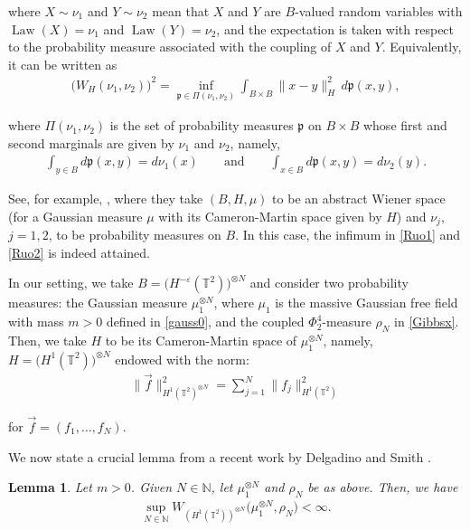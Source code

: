 \documentclass[letterpaper, 11pt,  reqno]{amsart}
\newtheorem{lemma}[theorem]{Lemma}
\DeclareMathOperator{\Law}{Law}
\newcommand{\1}{\hspace{0.5mm}\text{I}\hspace{0.2mm}}
\newcommand{\noi}{\noindent}
\newcommand{\T}{\mathbb{T}}
\newcommand{\N}{\mathbb{N}}
\newcommand{\eps}{\varepsilon}
\newcommand{\plan}{\mathfrak{p}}
\newcommand{\muN}{\mu_1^{\otimes N}}
\numberwithin{equation}{section}
\numberwithin{theorem}{section}
\begin{document}
\noi
where $X \sim \nu_1$ and $Y \sim \nu_2$ mean that $X$ and $Y$ are $B$-valued random variables 
with $\Law(X) = \nu_1$ and $\Law(Y) = \nu_2$, 
and the expectation is taken with respect 
to the probability measure associated with the coupling of $X$ and $Y$.
Equivalently, it can be written as
\begin{align}
\Big(W_H (\nu_1, \nu_2)\Big)^2
= \inf_{\plan\in\Pi(\nu_1, \nu_2)} 
\int_{B \times B}  \|x-y\|_H^2 \,  d\plan (x, y), 
\label{Ruo2}
\end{align}

\noi
where  $\Pi(\nu_1, \nu_2)$ is the set of probability measures $\plan$
on $B \times B$
whose first and second marginals are given by $\nu_1$ and $\nu_2$, 
namely, 
\begin{align}
 \int_{y \in B}  d\plan (x, y) = d\nu_1(x) \qquad \text{and}
\qquad 
 \int_{x \in B}  d\plan (x, y) = d\nu_2(y).
\label{Ruo2a}
\end{align}


\noi
See, for example, 
\cite{FU, FSS}, 
where 
they take $(B, H, \mu)$ to be an abstract Wiener space (for a Gaussian measure
$\mu$ with its Cameron-Martin space given by $H$)
and $\nu_j$, $j = 1, 2$, to be probability measures on $B$.
In this case, the infimum in \eqref{Ruo1} and \eqref{Ruo2} is indeed attained.


In our setting, we take
$B = \big(H^{-\eps} (\T^2)\big)^{\otimes N}$
and consider two probability measures:
the Gaussian measure $\muN$, where $\mu_1$
is the massive Gaussian free field with mass $m > 0$
defined in \eqref{gauss0}, 
and
the coupled $\Phi^4_2$-measure
$\rho_N$ in \eqref{Gibbsx}.
Then, we take 
 $H$ to be its Cameron-Martin space
 of $\muN$, 
 namely, 
$H = \big(H^1 (\T^2)\big)^{\otimes N}$
endowed with the norm:
\begin{align*}
\| \vec f \|_{H^1 (\T^2)^{\otimes N}}^2 =  \sum_{j = 1}^N \| f_j \|_{H^1 (\T^2)}^2
\end{align*}

\noi
for $\vec f = (f_1, \dots, f_N)$.





We now state a crucial lemma
from a recent work by 
Delgadino and Smith 
\cite[Theorem 2.6]{DS}.


\begin{lemma}
\label{LEM:DS}
Let $m > 0$.
Given $N \in \N$, let $\muN$ and $\rho_N$ be as above.
Then, we have 
\begin{align*}
\sup_{N \in \N} W_{(H^1 (\T^2))^{\otimes N}} \big(\muN, \rho_N\big) < \infty.
\end{align*}
\end{lemma}
\end{document}
